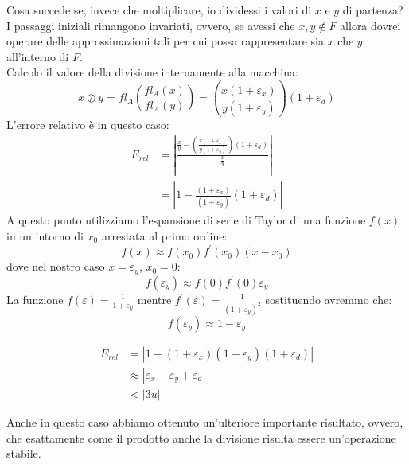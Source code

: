 \documentclass[12pt, a4paper]{book}
\theoremstyle{definition}
\begin{document}
\begin{flushleft}
Cosa succede se, invece che moltiplicare, io dividessi i valori di $x$ e $y$ di partenza?\\
I passaggi iniziali rimangono invariati, ovvero, se avessi che $x,y \notin F$ allora dovrei operare delle approssimazioni tali per cui possa rappresentare sia $x$ che $y$ all'interno di $F$. \\
Calcolo il valore della divisione internamente alla macchina: 
\[ x \oslash y =  fl_{A}\left(\frac{fl_{A}(x)}{fl_{A}(y)}\right) = \left(\frac{x(1+\varepsilon_{x})}{y(1+\varepsilon_{y})} \right)(1+\varepsilon_{d})\]
L'errore relativo è in questo caso: 
\begin{equation} \label{}
	\begin{split}
		E_{rel} &=  \displaystyle\left\lvert \frac{ \frac{x}{y} -  \left(\frac{x(1+\varepsilon_{x})}{y(1+\varepsilon_{y})} \right)(1+\varepsilon_{d})}{ \frac{x}{y}} \right\rvert  \\
				   &=  \displaystyle\left\lvert 1 - \frac{(1+\varepsilon_{x})}{(1+\varepsilon_{y})}(1+\varepsilon_{d}) \right\rvert
	\end{split}
\end{equation}
A questo punto utilizziamo l'espansione di serie di Taylor di una funzione $f(x)$ in un intorno di $x_{0}$ arrestata al primo ordine: 
\[ f(x) \approx f(x_{0})f^{'}(x_{0})(x-x_{0})  \]
dove nel nostro caso $x = \varepsilon_{y}$, $x_{0} = 0$:
\[ f(\varepsilon_{y}) \approx f(0)f^{'}(0)\varepsilon_{y}  \]
La funzione $f(\varepsilon) = \frac{1}{1+\varepsilon_{y}} $ mentre $f^{'}(\varepsilon) = \frac{1}{(1+\varepsilon_{y})^{2}} $ sostituendo avremmo che: 
\[ f(\varepsilon_{y}) \approx 1-\varepsilon_{y} \]

\begin{equation} \label{}
	\begin{split}
		E_{rel}  &=  \displaystyle\left\lvert 1 - (1+\varepsilon_{x})(1-\varepsilon_{y})(1+\varepsilon_{d}) \right\rvert \\
					&\approx  \displaystyle\left\lvert \varepsilon_{x} -  \varepsilon_{y} +  \varepsilon_{d} \right\rvert \\
					& < |3u|
	\end{split}
\end{equation}

Anche in questo caso abbiamo ottenuto un'ulteriore importante risultato, ovvero, che esattamente come il prodotto anche la divisione risulta essere un'operazione stabile.

\end{flushleft}
\end{document}
